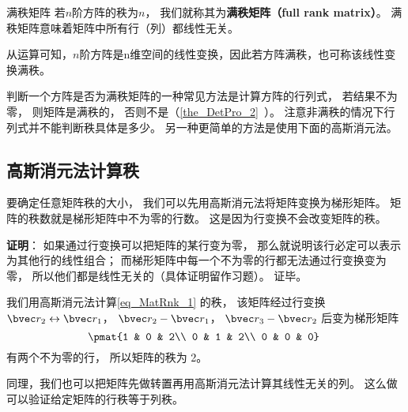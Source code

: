 \begin{definition}{满秩矩阵}
若$n$阶方阵的秩为$n$， 我们就称其为\textbf{满秩矩阵（full rank matrix）}。 满秩矩阵意味着矩阵中所有行（列）都线性无关。
\end{definition}
从运算可知，$n$阶方阵是n维空间的线性变换，因此若方阵满秩，也可称该线性变换满秩。

判断一个方阵是否为满秩矩阵的一种常见方法是计算方阵的行列式， 若结果不为零， 则矩阵是满秩的， 否则不是（\autoref{the_DetPro_2}~）。 注意非满秩的情况下行列式并不能判断秩具体是多少。 另一种更简单的方法是使用下面的高斯消元法。

\subsection{高斯消元法计算秩}
要确定任意矩阵秩的大小， 我们可以先用高斯消元法将矩阵变换为梯形矩阵。 矩阵的秩数就是梯形矩阵中不为零的行数。 这是因为行变换不会改变矩阵的秩。

\textbf{证明}： 如果通过行变换可以把矩阵的某行变为零， 那么就说明该行必定可以表示为其他行的线性组合； 而梯形矩阵中每一个不为零的行都无法通过行变换变为零， 所以他们都是线性无关的（具体证明留作习题）。 证毕。

\begin{example}{}
我们用高斯消元法计算\autoref{eq_MatRnk_1} 的秩， 该矩阵经过行变换 $\bvec r_2 \leftrightarrow \bvec r_1$， $\bvec r_2 - \bvec r_1$， $\bvec r_3 - \bvec r_2$ 后变为梯形矩阵
\begin{equation}
\pmat{1 & 0 & 2\\ 0 & 1 & 2\\ 0 & 0 & 0}~
\end{equation}
有两个不为零的行， 所以矩阵的秩为 2。
\end{example}

同理，我们也可以把矩阵先做转置再用高斯消元法计算其线性无关的列。 这么做可以验证给定矩阵的行秩等于列秩。

